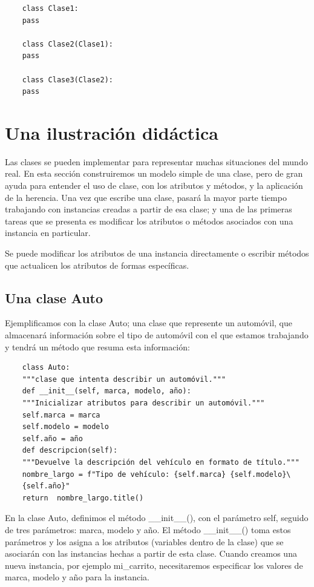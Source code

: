 {\begin{lstlisting}
	class Clase1:
	pass
	
	class Clase2(Clase1):
	pass
	
	class Clase3(Clase2):
	pass
\end{lstlisting}





\section{Una ilustración didáctica}


Las clases se pueden implementar para representar muchas situaciones del mundo real. En esta sección construiremos un modelo simple de una clase,  pero de gran ayuda para entender el uso de clase, con los atributos y métodos, y la aplicación de la herencia.  Una vez que escribe una clase, pasará la mayor parte tiempo trabajando con instancias creadas a partir de esa clase; y una de las primeras tareas que se presenta es modificar los atributos o métodos asociados con una instancia en particular. 

Se puede modificar los atributos de una instancia directamente o escribir métodos que actualicen los atributos de formas específicas.

\subsection{Una clase Auto}

Ejemplificamos con la clase Auto;  una  clase que represente un automóvil, que almacenará información sobre el tipo de automóvil con el que estamos trabajando y tendrá un método que resuma esta información:


\hspace{-2.0cm}{\ttfamily \scriptsize auto.py}  \vspace{-0.5cm}
\begin{lstlisting}
	class Auto:
	"""clase que intenta describir un automóvil."""
	def __init__(self, marca, modelo, año):
	"""Inicializar atributos para describir un automóvil."""
	self.marca = marca
	self.modelo = modelo
	self.año = año
	def descripcion(self):
	"""Devuelve la descripción del vehículo en formato de título."""
	nombre_largo = f"Tipo de vehículo: {self.marca} {self.modelo}\
	{self.año}"
	return  nombre_largo.title()
\end{lstlisting}


En la clase Auto, definimos el método  {\ttfamily \_\!\_init\_\!\_()}, con el parámetro {\ttfamily self}, seguido de  tres parámetros: {\ttfamily marca}, {\ttfamily modelo} y {\ttfamily año}. El método {\ttfamily \_\!\_init\_\!\_()} toma estos parámetros y los asigna a los atributos (variables dentro de la clase) que se asociarán con las instancias hechas a partir de esta clase. Cuando creamos una nueva instancia, por ejemplo {\ttfamily mi\_carrito}, necesitaremos especificar los valores de {\ttfamily marca}, {\ttfamily modelo} y {\ttfamily año} para la instancia.\\

}
